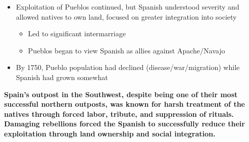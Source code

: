 \documentclass[a4paper]{article}
\begin{document}
{\begin{itemize}
                \item Exploitation of Pueblos continued, but Spanish understood severity and allowed natives to own land, focused on greater integration into society
                \begin{itemize}
                    \item Led to significant intermarriage
                    \item Pueblos began to view Spanish as allies against Apache/Navajo 
                \end{itemize}
                \item By 1750, Pueblo population had declined (disease/war/migration) while Spanish had grown somewhat
            \end{itemize}
            \textbf{Spain's outpost in the Southwest, despite being one of their most successful northern outposts, was known for harsh treatment of the natives through forced labor, tribute, and suppression of rituals. Damaging rebellions forced the Spanish to successfully reduce their exploitation through land ownership and social integration.}}
\end{document}
